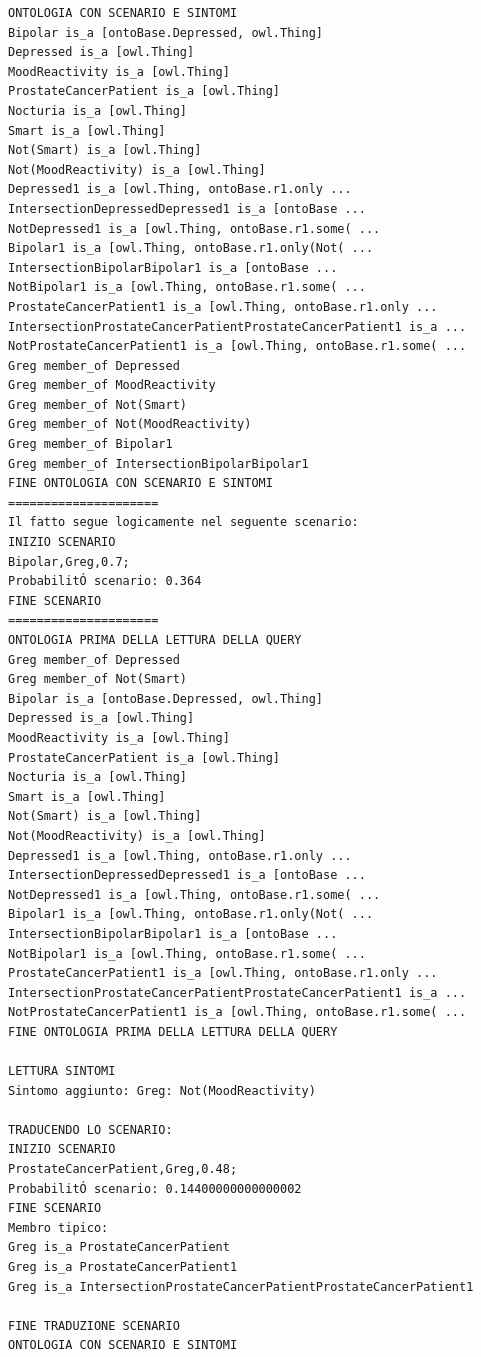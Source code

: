 \begin{verbatim}
ONTOLOGIA CON SCENARIO E SINTOMI
Bipolar is_a [ontoBase.Depressed, owl.Thing]
Depressed is_a [owl.Thing]
MoodReactivity is_a [owl.Thing]
ProstateCancerPatient is_a [owl.Thing]
Nocturia is_a [owl.Thing]
Smart is_a [owl.Thing]
Not(Smart) is_a [owl.Thing]
Not(MoodReactivity) is_a [owl.Thing]
Depressed1 is_a [owl.Thing, ontoBase.r1.only ...
IntersectionDepressedDepressed1 is_a [ontoBase ...
NotDepressed1 is_a [owl.Thing, ontoBase.r1.some( ...
Bipolar1 is_a [owl.Thing, ontoBase.r1.only(Not( ...
IntersectionBipolarBipolar1 is_a [ontoBase ...
NotBipolar1 is_a [owl.Thing, ontoBase.r1.some( ...
ProstateCancerPatient1 is_a [owl.Thing, ontoBase.r1.only ...
IntersectionProstateCancerPatientProstateCancerPatient1 is_a ...
NotProstateCancerPatient1 is_a [owl.Thing, ontoBase.r1.some( ...
Greg member_of Depressed
Greg member_of MoodReactivity
Greg member_of Not(Smart)
Greg member_of Not(MoodReactivity)
Greg member_of Bipolar1
Greg member_of IntersectionBipolarBipolar1
FINE ONTOLOGIA CON SCENARIO E SINTOMI
=====================
Il fatto segue logicamente nel seguente scenario: 
INIZIO SCENARIO
Bipolar,Greg,0.7; 
ProbabilitÓ scenario: 0.364
FINE SCENARIO
=====================
ONTOLOGIA PRIMA DELLA LETTURA DELLA QUERY
Greg member_of Depressed
Greg member_of Not(Smart)
Bipolar is_a [ontoBase.Depressed, owl.Thing]
Depressed is_a [owl.Thing]
MoodReactivity is_a [owl.Thing]
ProstateCancerPatient is_a [owl.Thing]
Nocturia is_a [owl.Thing]
Smart is_a [owl.Thing]
Not(Smart) is_a [owl.Thing]
Not(MoodReactivity) is_a [owl.Thing]
Depressed1 is_a [owl.Thing, ontoBase.r1.only ...
IntersectionDepressedDepressed1 is_a [ontoBase ...
NotDepressed1 is_a [owl.Thing, ontoBase.r1.some( ...
Bipolar1 is_a [owl.Thing, ontoBase.r1.only(Not( ...
IntersectionBipolarBipolar1 is_a [ontoBase ...
NotBipolar1 is_a [owl.Thing, ontoBase.r1.some( ...
ProstateCancerPatient1 is_a [owl.Thing, ontoBase.r1.only ...
IntersectionProstateCancerPatientProstateCancerPatient1 is_a ...
NotProstateCancerPatient1 is_a [owl.Thing, ontoBase.r1.some( ...
FINE ONTOLOGIA PRIMA DELLA LETTURA DELLA QUERY

LETTURA SINTOMI
Sintomo aggiunto: Greg: Not(MoodReactivity)

TRADUCENDO LO SCENARIO: 
INIZIO SCENARIO
ProstateCancerPatient,Greg,0.48; 
ProbabilitÓ scenario: 0.14400000000000002
FINE SCENARIO
Membro tipico:
Greg is_a ProstateCancerPatient
Greg is_a ProstateCancerPatient1
Greg is_a IntersectionProstateCancerPatientProstateCancerPatient1

FINE TRADUZIONE SCENARIO
ONTOLOGIA CON SCENARIO E SINTOMI


\end{verbatim}
